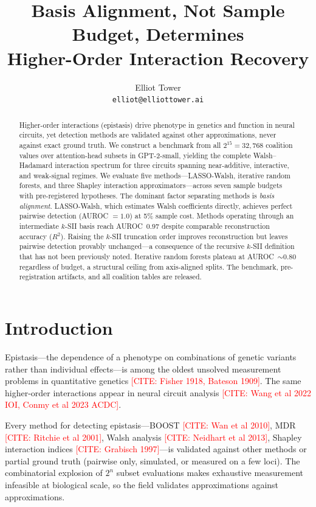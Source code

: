 \documentclass[11pt]{article}
\title{Basis Alignment, Not Sample Budget, Determines\\Higher-Order Interaction Recovery}
\author{
  Elliot Tower \\
  \texttt{elliot@elliottower.ai}
}
\newcommand{\citeneeded}[1]{\textcolor{red}{[CITE: #1]}}
\begin{document}
\maketitle

\begin{abstract}
Higher-order interactions (epistasis) drive phenotype in genetics and
function in neural circuits, yet detection methods are validated
against other approximations, never against exact ground truth.
We construct a benchmark from all $2^{15} = 32{,}768$ coalition
values over attention-head subsets in GPT-2-small, yielding the
complete Walsh--Hadamard interaction spectrum for three circuits
spanning near-additive, interactive, and weak-signal regimes.
We evaluate five methods---LASSO-Walsh, iterative random forests,
and three Shapley interaction approximators---across seven sample
budgets with pre-registered hypotheses.
%
The dominant factor separating methods is \emph{basis alignment}.
LASSO-Walsh, which estimates Walsh coefficients directly, achieves
perfect pairwise detection (AUROC $= 1.0$) at 5\% sample cost.
Methods operating through an intermediate $k$-SII basis reach
AUROC~$0.97$ despite comparable reconstruction accuracy ($R^2$).
Raising the $k$-SII truncation order improves reconstruction but
leaves pairwise detection provably unchanged---a consequence of
the recursive $k$-SII definition that has not been previously noted.
Iterative random forests plateau at AUROC~$\sim 0.80$ regardless of
budget, a structural ceiling from axis-aligned splits.
The benchmark, pre-registration artifacts, and all coalition tables
are released.
\end{abstract}


\section{Introduction}
\label{sec:intro}

Epistasis---the dependence of a phenotype on combinations of genetic
variants rather than individual effects---is among the oldest unsolved
measurement problems in quantitative genetics
\citeneeded{Fisher 1918, Bateson 1909}.
The same higher-order interactions appear in neural circuit analysis
\citeneeded{Wang et al 2022 IOI, Conmy et al 2023 ACDC}.

Every method for detecting epistasis---BOOST \citeneeded{Wan et al 2010},
MDR \citeneeded{Ritchie et al 2001}, Walsh analysis
\citeneeded{Neidhart et al 2013}, Shapley interaction indices
\citeneeded{Grabisch 1997}---is validated against other methods or
partial ground truth (pairwise only, simulated, or measured on a few
loci). The combinatorial explosion of $2^n$ subset evaluations makes
exhaustive measurement infeasible at biological scale, so the field
validates approximations against approximations.
\end{document}
